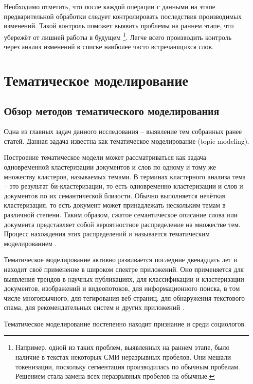 Необходимо отметить, что после каждой операции с данными на этапе предварительной обработки следует контролировать последствия производимых изменений. Такой контроль поможет выявить проблемы на раннем этапе, что убережёт от лишней работы в будущем \footnote{Например, одной из таких проблем, выявленных на раннем этапе, было наличие в текстах некоторых СМИ неразрывных пробелов. Они мешали токенизации, поскольку сегментация производилась по обычным пробелам. Решением стала замена всех неразрывных пробелов на обычные.}. Легче всего производить контроль через анализ изменений в списке наиболее часто встречающихся слов.

\section{Тематическое моделирование}

\subsection{Обзор методов тематического моделирования}
Одна из главных задач данного исследования -- выявление тем собранных ранее статей. Данная задача известна как тематическое моделирование (topic modeling).

Построение тематическое модели может рассматриваться как задача одновременной кластеризации документов и слов по одному и тому же множеству кластеров, называемых темами. В терминах кластерного анализа тема -- это результат би-кластеризации, то есть одновременно кластеризации и слов и документов по их семантической близости. Обычно выполняется нечёткая кластеризация, то есть документ может принадлежать нескольким темам в различной степени. Таким образом, сжатое семантическое описание слова или документа представляет собой вероятностное распределение на множестве тем. Процесс нахождения этих распределений и называется тематическим моделированием \cite{korshunov2012}.

Тематическое моделирование активно развивается последние двенадцать лет и находит своё применение в широком спектре приложений. Оно применяется для выявления трендов в научных публикациях, для классификации и кластеризации документов, изображений и видеопотоков, для информационного поиска, в том числе многоязычного, для тегирования веб-страниц, для обнаружения текстового спама, для рекомендательных систем и других приложений \cite[стр. 4]{voroncov2013}. 

Тематическое моделирование постепенно находит признание и среди социологов. %

